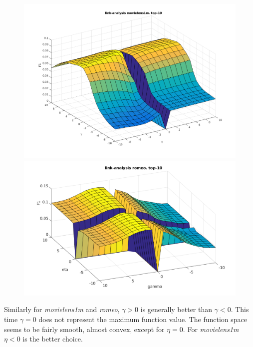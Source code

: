 \begin{figure}[h!]
\centering
\begin{minipage}{.5\textwidth}
    \centering
    \includegraphics[width=\linewidth]{fig/link_eta_gamma/movielens_link.png}
\end{minipage}%
\begin{minipage}{.5\textwidth}
    \centering
    \includegraphics[width=\linewidth]{fig/link_eta_gamma/romeo_link.png}
\end{minipage}
\end{figure}

Similarly for \textit{movielens1m} and \textit{romeo}, $\gamma > 0$ is generally better than $\gamma < 0$. This time $\gamma = 0$ does not represent the maximum function value. The function space seems to be fairly smooth, almost convex, except for $\eta = 0$. For \textit{movielens1m} $\eta < 0$ is the better choice.

